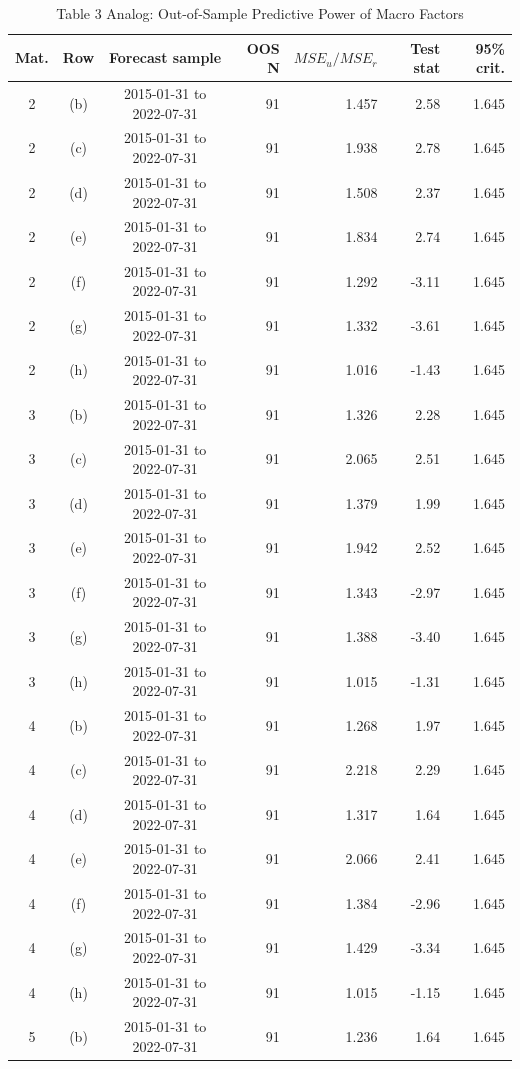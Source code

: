 \begin{table}[p]
\centering
\caption{Table 3 Analog: Out-of-Sample Predictive Power of Macro Factors}
\small
\begin{tabular}{cccrrrr}\hline
Mat. & Row & Forecast sample & OOS N & $MSE_u/MSE_r$ & Test stat & 95\% crit.\\\hline
2 & (b) & 2015-01-31 to 2022-07-31 & 91 & 1.457 & 2.58 & 1.645\\
2 & (c) & 2015-01-31 to 2022-07-31 & 91 & 1.938 & 2.78 & 1.645\\
2 & (d) & 2015-01-31 to 2022-07-31 & 91 & 1.508 & 2.37 & 1.645\\
2 & (e) & 2015-01-31 to 2022-07-31 & 91 & 1.834 & 2.74 & 1.645\\
2 & (f) & 2015-01-31 to 2022-07-31 & 91 & 1.292 & -3.11 & 1.645\\
2 & (g) & 2015-01-31 to 2022-07-31 & 91 & 1.332 & -3.61 & 1.645\\
2 & (h) & 2015-01-31 to 2022-07-31 & 91 & 1.016 & -1.43 & 1.645\\
3 & (b) & 2015-01-31 to 2022-07-31 & 91 & 1.326 & 2.28 & 1.645\\
3 & (c) & 2015-01-31 to 2022-07-31 & 91 & 2.065 & 2.51 & 1.645\\
3 & (d) & 2015-01-31 to 2022-07-31 & 91 & 1.379 & 1.99 & 1.645\\
3 & (e) & 2015-01-31 to 2022-07-31 & 91 & 1.942 & 2.52 & 1.645\\
3 & (f) & 2015-01-31 to 2022-07-31 & 91 & 1.343 & -2.97 & 1.645\\
3 & (g) & 2015-01-31 to 2022-07-31 & 91 & 1.388 & -3.40 & 1.645\\
3 & (h) & 2015-01-31 to 2022-07-31 & 91 & 1.015 & -1.31 & 1.645\\
4 & (b) & 2015-01-31 to 2022-07-31 & 91 & 1.268 & 1.97 & 1.645\\
4 & (c) & 2015-01-31 to 2022-07-31 & 91 & 2.218 & 2.29 & 1.645\\
4 & (d) & 2015-01-31 to 2022-07-31 & 91 & 1.317 & 1.64 & 1.645\\
4 & (e) & 2015-01-31 to 2022-07-31 & 91 & 2.066 & 2.41 & 1.645\\
4 & (f) & 2015-01-31 to 2022-07-31 & 91 & 1.384 & -2.96 & 1.645\\
4 & (g) & 2015-01-31 to 2022-07-31 & 91 & 1.429 & -3.34 & 1.645\\
4 & (h) & 2015-01-31 to 2022-07-31 & 91 & 1.015 & -1.15 & 1.645\\
5 & (b) & 2015-01-31 to 2022-07-31 & 91 & 1.236 & 1.64 & 1.645\\

\end{tabular}
\end{table}
